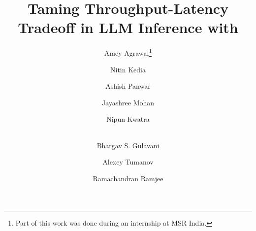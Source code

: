 \documentclass[letterpaper,twocolumn,10pt]{article}
\date{}
\title{\Large \bf Taming Throughput-Latency Tradeoff in LLM Inference with \textit{\sysname}}
\begin{document}
\author[2]{Amey Agrawal\thanks{Part of this work was done during an internship at MSR India.}}\author[1]{Nitin Kedia}\author[1]{Ashish Panwar}\author[1]{Jayashree Mohan}\author[1]{Nipun Kwatra}\author[1]{\\Bhargav S. Gulavani}\author[2]{Alexey Tumanov}\author[1]{Ramachandran Ramjee} 


\maketitle












\label{EndOfPaper}




\end{document}
